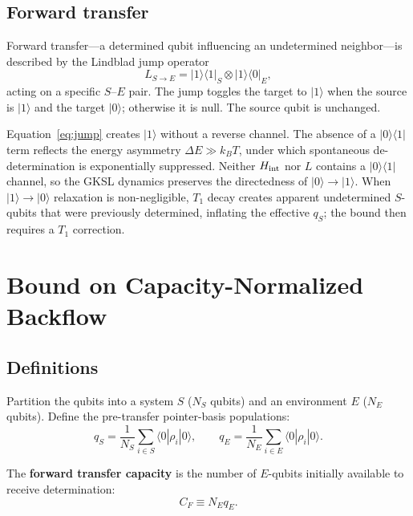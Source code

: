 \documentclass[aps,pra,twocolumn,superscriptaddress,hyperref]{revtex4-2}
\begin{document}
\subsection{Forward transfer}

Forward transfer---a determined qubit influencing an undetermined neighbor---is described by the Lindblad jump operator~\cite{Lindblad:1976,GKS:1976}
\begin{equation}
L_{S\to E} = |1\rangle\langle 1|_S \otimes |1\rangle\langle 0|_E,
\label{eq:jump}
\end{equation}
acting on a specific $S$--$E$ pair. The jump toggles the target to $|1\rangle$ when the source is $|1\rangle$ and the target $|0\rangle$; otherwise it is null. The source qubit is unchanged.

Equation~\eqref{eq:jump} creates $|1\rangle$ without a reverse channel. The absence of a $|0\rangle\langle 1|$ term reflects the energy asymmetry $\Delta E \gg k_B T$, under which spontaneous de-determination is exponentially suppressed. Neither $H_{\rm int}$ nor $L$ contains a $|0\rangle\langle 1|$ channel, so the GKSL dynamics preserves the directedness of $|0\rangle \to |1\rangle$. When $|1\rangle \to |0\rangle$ relaxation is non-negligible, $T_1$ decay creates apparent undetermined $S$-qubits that were previously determined, inflating the effective $q_S$; the bound then requires a $T_1$ correction.

\section{Bound on Capacity-Normalized Backflow}
\label{sec:theorem}

\subsection{Definitions}

Partition the qubits into a system $S$ ($N_S$ qubits) and an environment $E$ ($N_E$ qubits). Define the pre-transfer pointer-basis populations:
\begin{equation}
q_S = \frac{1}{N_S}\sum_{i\in S} \langle 0|\rho_i|0\rangle, \qquad
q_E = \frac{1}{N_E}\sum_{i\in E} \langle 0|\rho_i|0\rangle.
\end{equation}

The \textbf{forward transfer capacity} is the number of $E$-qubits initially available to receive determination:
\begin{equation}
C_F \equiv N_E q_E.
\end{equation}
\end{document}
